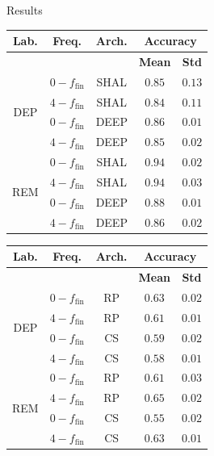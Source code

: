 \documentclass{beamer}
\begin{document}
\begin{frame}{Results}
\begin{table}[tbp]
\centering
\scriptsize
  \parbox{0.495\linewidth}{
\centering
\begin{tabular}{|c|c|c|c|c|}
\hline
\textbf{Lab.} & \textbf{Freq.} & \textbf{Arch.} & \multicolumn{2}{c}{\textbf{Accuracy}} \vline \\ \hline
& & & \textbf{Mean} & \textbf{Std} \\ \hline
\multirow{4}{*}{DEP} & $0-f_{\text{fin}}$ & SHAL &  $0.85$ & $0.13$    \\ \cline{2-5}
                     & $4-f_{\text{fin}}$ & SHAL &     $0.84$ & $0.11$    \\ \cline{2-5} 
                     & $0-f_{\text{fin}}$ & DEEP &     $\mathbf{0.86}$ & $0.01$    \\ \cline{2-5} 
                     & $4-f_{\text{fin}}$ & DEEP &     $0.85$ & $0.02$    \\ \hline
\multirow{4}{*}{REM} & $0-f_{\text{fin}}$ & SHAL &  $\mathbf{0.94}$ & $0.02$    \\ \cline{2-5} 
                     & $4-f_{\text{fin}}$ & SHAL &     $0.94$ & $0.03$    \\ \cline{2-5} 
                     & $0-f_{\text{fin}}$ & DEEP &     $0.88$ & $0.01$    \\ \cline{2-5} 
                     & $4-f_{\text{fin}}$ & DEEP &     $0.86$ & $0.02$    \\ \hline
\end{tabular}
}
\hfill
  \parbox{0.495\linewidth}{
\centering
\begin{tabular}{|c|c|c|c|c|}
\hline
\textbf{Lab.} & \textbf{Freq.} & \textbf{Arch.} & \multicolumn{2}{c}{\textbf{Accuracy}} \vline \\ \hline
& & & \textbf{Mean} & \textbf{Std} \\ \hline
\multirow{4}{*}{DEP} & $0-f_{\text{fin}}$ & RP &   $\mathbf{0.63}$ & $0.02$ \\ \cline{2-5}      
                     & $4-f_{\text{fin}}$ & RP &      $0.61$ & $0.01$   \\ \cline{2-5}             
                     & $0-f_{\text{fin}}$ & CS &      $0.59$ & $0.02$  \\ \cline{2-5}              
                     & $4-f_{\text{fin}}$ & CS &      $0.58$ & $0.01$ \\ \hline
\multirow{4}{*}{REM} & $0-f_{\text{fin}}$ & RP &   $0.61$ & $0.03$ \\ \cline{2-5}               
                     & $4-f_{\text{fin}}$ & RP &       $\mathbf{0.65}$ & $0.02$    \\ \cline{2-5}   
                     & $0-f_{\text{fin}}$ & CS &      $0.55$ & $0.02$ \\ \cline{2-5}               
                     & $4-f_{\text{fin}}$ & CS &      $0.63$ & $0.01$ \\ \hline               
\end{tabular}
}
\end{table}
\end{frame}
\end{document}
